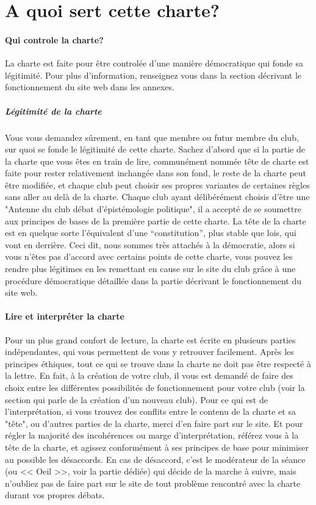 \documentclass[a4paper,12pt]{article}
\begin{document}
\section{A quoi sert cette charte?}

\paragraph{Qui controle la charte?}
La charte est faite pour être controlée d'une manière démocratique qui fonde sa légitimité. Pour plus d'information, renseignez vous dans la section décrivant le fonctionnement du site web dans les annexes.
\subparagraph{Légitimité de la charte}
Vous vous demandez sûrement, en tant que membre ou futur membre du club, sur quoi se fonde le légitimité de cette charte. Sachez d'abord que si la partie de la charte que vous êtes en train de lire, communément nommée tête de charte est faite pour rester relativement inchangée dans son fond, le reste de la charte peut être modifiée, et chaque club peut choisir ses propres variantes de certaines règles sans aller au delà de la charte. Chaque club ayant délibérément choisis d'être une "Antenne du club débat d'épistémologie politique", il a accepté de se soumettre aux principes de bases de la première partie de cette charte. La tête de la charte est en quelque sorte l'équivalent d'une ``constitution'', plus stable que lois, qui vont en derrière. Ceci dit, nous sommes très attachés à la démocratie, alors si vous n'êtes pas d'accord avec certains points de cette charte, vous pouvez les rendre plus légitimes en les remettant en cause sur le site du club grâce à une procédure démocratique détaillée dans la partie décrivant le fonctionnement du site web.

\paragraph{Lire et interpréter la charte}
Pour un plus grand confort de lecture, la charte est écrite en plusieurs parties indépendantes, qui vous permettent de vous y retrouver facilement. Après les principes éthiques, tout ce qui se trouve dans la charte ne doit pas être respecté à la lettre. En fait, à la création de votre club, il vous est demandé de faire des choix entre les différentes possibilités de fonctionnement pour votre club (voir la section qui parle de la création d'un nouveau club). Pour ce qui est de l'interprétation, si vous trouvez des conflits entre le contenu de la charte et sa "tête", ou d'autres parties de la charte, merci d'en faire part sur le site. Et pour régler la majorité des incohérences ou marge d'interprétation, référez vous à la tête de la charte, et agissez conformément à ses principes de base pour minimiser au possible les désaccords. En cas de désaccord, c'est le modérateur de la séance (ou << Oeil >>, voir la partie dédiée) qui décide de la marche à suivre, mais n'oubliez pas de faire part sur le site de tout problème rencontré avec la charte durant vos propres débats.
\end{document}
